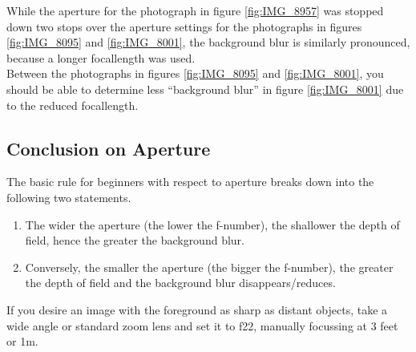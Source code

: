 While the \gls{aperture} for the photograph in figure \ref{fig:IMG_8957} was stopped down two \glspl{stop} over the \gls{aperture} settings for the photographs in figures \ref{fig:IMG_8095} and \ref{fig:IMG_8001}, the background blur is similarly pronounced, because a longer \gls{focallength} was used.
\\
Between the photographs in figures \ref{fig:IMG_8095} and \ref{fig:IMG_8001}, you should be able to determine less ``background blur'' in figure \ref{fig:IMG_8001} due to the reduced \gls{focallength}.

\subsection{Conclusion on Aperture}

The basic rule for beginners with respect to \gls{aperture} breaks down into the following two statements.

\begin{enumerate}[1]
	\item The wider the \gls{aperture} (the lower the f-number), the shallower the depth of field, hence the greater the background blur.
	\item Conversely, the smaller the \gls{aperture} (the bigger the f-number), the greater the depth of field and the background blur disappears/reduces.
\end{enumerate} 

If you desire an image with the foreground as sharp as distant objects, take a wide angle or standard zoom lens and set it to f22, manually focussing at 3 feet or 1m. 
